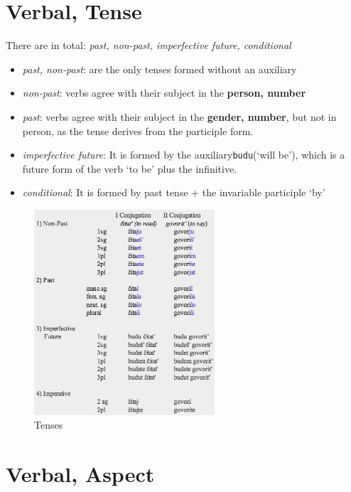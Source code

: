 \documentclass[
  a4paperpaper,
]{report}
\providecommand{\tightlist}{%
  \setlength{\itemsep}{0pt}\setlength{\parskip}{0pt}}
\begin{document}
\hypertarget{verbal-tense}{%
\section{Verbal, Tense}\label{verbal-tense}}

There are in total: \emph{past, non-past, imperfective future,
conditional}

\begin{itemize}
\tightlist
\item
  \emph{past, non-past}: are the only tenses formed without an auxiliary
\item
  \emph{non-past}: verbs agree with their subject in the \textbf{person,
  number}
\item
  \emph{past}: verbs agree with their subject in the \textbf{gender,
  number}, but not in person, as the tense derives from the participle
  form.
\item
  \emph{imperfective future}: It is formed by the
  auxiliary\texttt{budu}(`will be'), which is a future form of the verb
  `to be' plus the infinitive.
\item
  \emph{conditional}: It is formed by past tense + the invariable
  participle `by'
\end{itemize}

\begin{figure}
\centering
\includegraphics[width=0.6\textwidth,height=\textheight]{./tense.jpg}
\caption{Tenses}
\end{figure}

\hypertarget{verbal-aspect}{%
\section{Verbal, Aspect}\label{verbal-aspect}}
\end{document}

